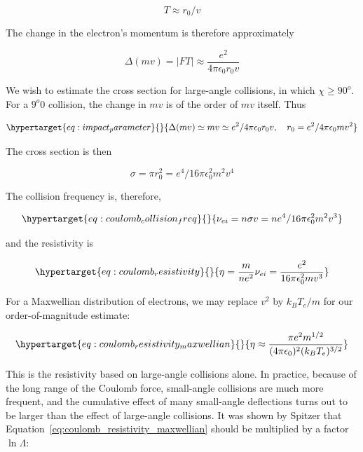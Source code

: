 \documentclass[
  notoc %
]{tufte-book}
\begin{document}
\[
T \approx r_0 / v
\]

The change in the electron's momentum is therefore approximately

\[
\Delta(mv) = |FT| \approx \frac{e^2}{4\pi\epsilon_0r_0v}
\]

We wish to estimate the cross section for large-angle collisions, in
which \(\chi \ge 90^o\). For a \(9^o0\) collision, the change in \(mv\)
is of the order of \(mv\) itself. Thus

\begin{equation}\protect\hypertarget{eq:impact_parameter}{}{
\Delta(mv) \simeq mv \simeq e^2/4\pi\epsilon_0r_0v,\quad r_0 = e^2/4\pi\epsilon_0 mv^2
}\label{eq:impact_parameter}\end{equation}

The cross section is then

\[
\sigma = \pi r_0^2 = e^4 / 16\pi\epsilon_0^2 m^2v^4
\]

The collision frequency is, therefore,

\begin{equation}\protect\hypertarget{eq:coulomb_collision_freq}{}{
\nu_{ei} = n\sigma v = ne^4/16\pi\epsilon_0^2 m^2 v^3
}\label{eq:coulomb_collision_freq}\end{equation}

and the resistivity is

\begin{equation}\protect\hypertarget{eq:coulomb_resistivity}{}{
\eta = \frac{m}{ne^2}\nu_{ei} = \frac{e^2}{16\pi\epsilon_0^2 mv^3}
}\label{eq:coulomb_resistivity}\end{equation}

For a Maxwellian distribution of electrons, we may replace \(v^2\) by
\(k_B T_e/m\) for our order-of-magnitude estimate:

\begin{equation}\protect\hypertarget{eq:coulomb_resistivity_maxwellian}{}{
\eta \approx \frac{\pi e^2m^{1/2}}{(4\pi\epsilon_0)^2 (k_B T_e)^{3/2}}
}\label{eq:coulomb_resistivity_maxwellian}\end{equation}

This is the resistivity based on large-angle collisions alone. In
practice, because of the long range of the Coulomb force, small-angle
collisions are much more frequent, and the cumulative effect of many
small-angle deflections turns out to be larger than the effect of
large-angle collisions. It was shown by Spitzer that
Equation~\ref{eq:coulomb_resistivity_maxwellian} should be multiplied by
a factor \(\ln \Lambda\):
\end{document}
